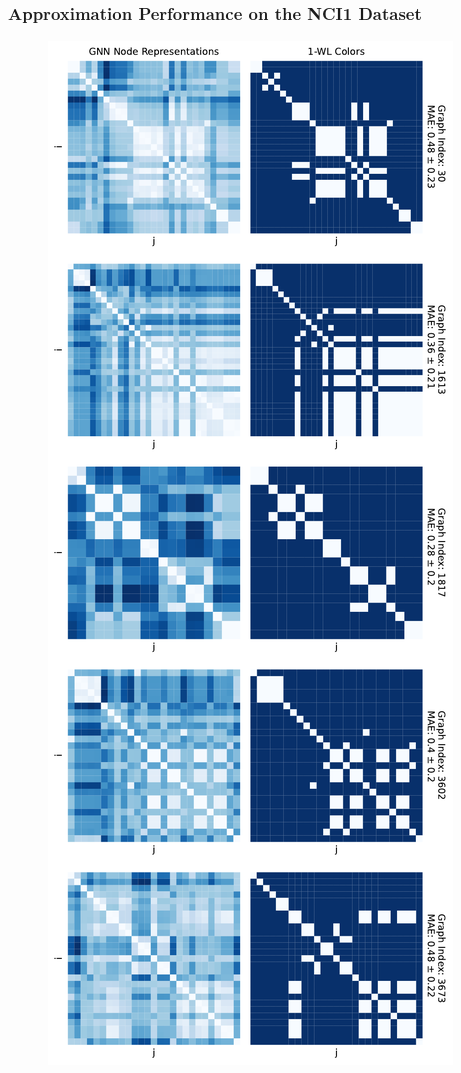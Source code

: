 \subsubsection{\gnn Approximation Performance on the NCI1 Dataset}
\begin{figure}[H]
    \centering
    \begin{minipage}[b]{0.45992852703\textwidth}
        \centering
        \includegraphics[width=\textwidth, left]{Figures/heatmaps_NCI1_0_k_wl_1.pdf}

\end{minipage}
\end{figure}
